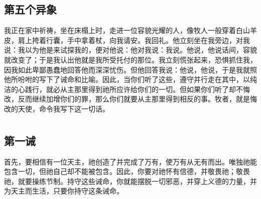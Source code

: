 \subsection{第五个异象}

\par

我正在家中祈祷，坐在床榻上时，走进一位容貌光耀的人，像牧人一般穿着白山羊皮，肩上挎着行囊，手中拿着杖，向我请安。我回礼。他立刻坐在我旁边，对我说：我以为他是来试探我的，便对他说：他对我说：我说。他说，他说话间，容貌就改变了；于是我认出他就是我所受托付的那位。我立刻慌张起来，恐惧抓住我，因我如此卑鄙愚蠢地回答他而深深忧伤。但他回答我说：他说，他说，于是我就照他所吩咐的写下了诫命和比喻。因此，当你们听了这些，遵守并行走在其中，以纯洁的心践行，就必从主那里得到祂所应许给你们的一切。但如果你们听了却不悔改，反而继续加增你们的罪，那么你们就要从主那里得到相反的事。牧者，就是悔改的天使，命令我写下这一切话。\par



\section{}


\subsection{第一诫}

\par

首先，要相信有一位天主，祂创造了并完成了万有，使万有从无有而出。唯独祂能包含一切，但祂自己却不能被包含。因此，你要对祂怀有信德，并敬畏祂；敬畏祂，就要操练节制。持守这些诫命，你就能摆脱一切邪恶，并穿上义德的力量，并为天主而生活，只要你持守这条诫命。\par

